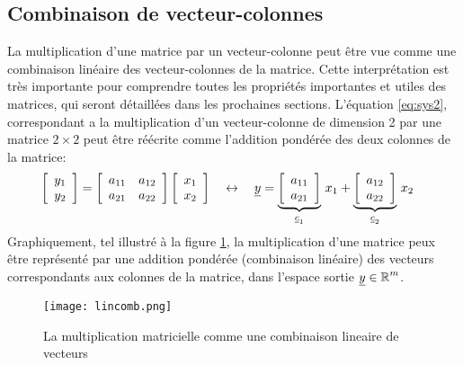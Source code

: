 \subsection{Combinaison de vecteur-colonnes}
\label{sec:combveccol}

La multiplication d'une matrice par un vecteur-colonne peut être vue comme une combinaison linéaire des vecteur-colonnes de la matrice. Cette interprétation est très importante pour comprendre toutes les propriétés importantes et utiles des matrices, qui seront détaillées dans les prochaines sections. L’équation \eqref{eq:sys2}, correspondant a la multiplication d'un vecteur-colonne de dimension 2 par une matrice $2\times2$ peut être réécrite comme l'addition pondérée des deux colonnes de la matrice:
%
\begin{align}
\left[ \begin{array}{c} 
	y_1 \\ y_2
\end{array} \right] &= 
\left[ \begin{array}{c c} 
a_{11} & a_{12} \\ a_{21} & a_{22}
\end{array} \right]
\left[ \begin{array}{c} 
	x_1 \\ x_2
\end{array} \right] \quad \leftrightarrow \quad  \col{y}  =   
%
\underbrace{\left[ \begin{array}{c} 
	a_{11} \\ a_{21}
\end{array} \right]}_{\col{c}_1} \, x_1 +
\underbrace{\left[ \begin{array}{c} 
	a_{12} \\ a_{22}
\end{array} \right]}_{\col{c}_2} \, x_2
\label{eq:sys2-col}
\end{align}
%
Graphiquement, tel illustré à la figure \ref{fig:lincomb}, la multiplication d'une matrice peux être représenté par une addition pondérée (combinaison linéaire) des vecteurs correspondants aux colonnes de la matrice, dans l'espace sortie $\underline{y} \in \operatorname{\mathbb{R}}^m$.

\begin{figure}[H]
	\centering
		\texttt{[image: lincomb.png]}
	\caption{La multiplication matricielle comme une combinaison lineaire de vecteurs}
	\label{fig:lincomb}
\end{figure}

